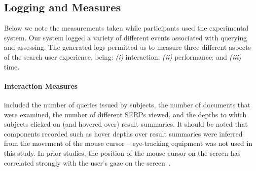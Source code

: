 



\subsection{Logging and Measures}\label{sec:method:behaviours}
Below we note the measurements taken while participants used the experimental system.
Our system logged a variety of different events associated with querying and assessing. The generated logs permitted us to measure three different aspects of the search user experience, being: \emph{(i)} interaction; \emph{(ii)} performance; and \emph{(iii)} time. 

\paragraph{Interaction Measures} included the number of queries issued by subjects, the number of documents that were examined, the number of different SERPs viewed, and the depths to which subjects clicked on (and hovered over) result summaries. It should be noted that components recorded such as hover depths over result summaries were inferred from the movement of the mouse cursor -- eye-tracking equipment was not used in this study. In prior studies, the position of the mouse cursor on the screen has correlated strongly with the user's gaze on the screen~\cite{chen2001mouse_cursor,smucker2014judging_relevance_movements}.
\vspace*{2mm}

